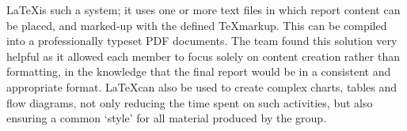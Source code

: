 \LaTeX is such a system; it uses one or more text files in which report content can be placed, and marked-up with the defined \TeX markup. This can be compiled into a professionally typeset PDF documents. The team found this solution very helpful as it allowed each member to focus solely on content creation rather than formatting, in the knowledge that the final report would be in a consistent and appropriate format. \LaTeX can also be used to create complex charts, tables and flow diagrams, not only reducing the time spent on such activities, but also ensuring a common `style' for all material produced by the group.
